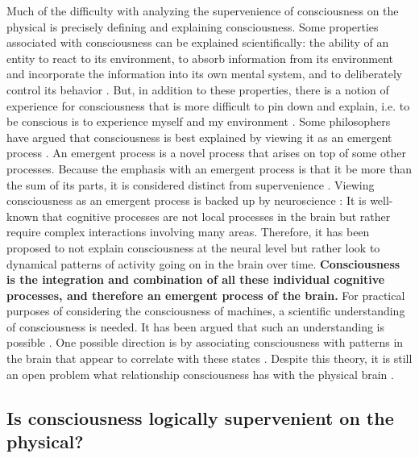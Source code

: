 \documentclass{article}
\begin{document}
Much of the difficulty with analyzing the supervenience of consciousness on the physical is precisely defining and explaining consciousness. Some properties associated with consciousness can be explained scientifically: the ability of an entity to react to its environment, to absorb information from its environment and incorporate the information into its own mental system, and to deliberately control its behavior \cite{chalmers1995facing}. But, in addition to these properties, there is a notion of experience for consciousness that is more difficult to pin down and explain, i.e. to be conscious is to experience myself and my environment \cite{chalmers1995facing}.
Some philosophers have argued that consciousness is best explained by viewing it as an emergent process \cite{humphreys1997emergence,mclaughlin1997emergence}. An emergent process is a novel process that arises on top of some other processes. Because the emphasis with an emergent process is that it be more than the sum of its parts, it is considered distinct from supervenience \cite{humphreys1997emergence}. Viewing consciousness as an emergent process is backed up by neuroscience \cite{thompson2001radical}: It is well-known that cognitive processes are not local processes in the brain but rather require complex interactions involving many areas.  Therefore,  it has been proposed to not explain consciousness at the neural level but rather look to dynamical patterns of activity going on in the brain over time. \textbf{Consciousness is the integration and combination of all these individual cognitive processes, and therefore an emergent process of the brain.}
For practical purposes of considering the consciousness of machines, a scientific understanding of consciousness is needed. It has been argued that such an understanding is possible \cite{place1970consciousness}. One possible direction is by associating consciousness with patterns in the brain that appear to correlate with these states \cite{place1970consciousness}. Despite this theory, it is still an open problem what relationship consciousness has with the physical brain \cite{koch2018consciousness}.


\subsection*{Is consciousness logically supervenient on the physical?}
\end{document}
